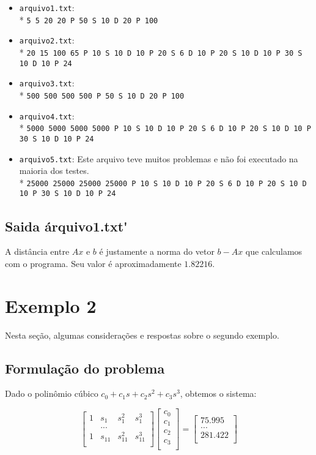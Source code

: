 \documentclass[12pt,a4paper]{article}
\begin{document}
\begin{itemize}
\item \verb+arquivo1.txt+: \\*
\texttt{5 5 20 20 P 50 S 10 D 20 P 100}
\item \verb+arquivo2.txt+: \\*
\texttt{20 15 100 65 P 10 S 10 D 10 P 20 S 6 D 10 P 20 S 10 D 10 P 30 S 10 D 10 P 24}
\item \verb+arquivo3.txt+: \\*
\texttt{500 500 500 500 P 50 S 10 D 20 P 100}
\item \verb+arquivo4.txt+: \\*
\texttt{5000 5000 5000 5000 P 10 S 10 D 10 P 20 S 6 D 10 P 20 S 10 D 10 P 30 S 10 D 10 P 24}
\item \verb+arquivo5.txt+: Este arquivo teve muitos problemas e não foi executado na maioria dos testes. \\*
\texttt{25000 25000 25000 25000 P 10 S 10 D 10 P 20 S 6 D 10 P 20 S 10 D 10 P 30 S 10 D 10 P 24}
\end{itemize}

\subsection{Saida \'arquivo1.txt\'}


A distância entre $Ax$ e $b$ é justamente a norma do vetor $b-Ax$ que calculamos com o programa.
Seu valor é aproximadamente $1.82216$.

\pagebreak
\section{Exemplo 2}
Nesta seção, algumas considerações e respostas sobre o segundo exemplo.
\subsection{Formulação do problema}
Dado o polinômio cúbico $c_0 + c_1s + c_2s^2 + c_3s^3$, obtemos o sistema:

\[
\left[
\begin{array}{cccc}
    1 & s_1 & s_{1}^{2} & s_{1}^{3} \\
      & ... \\
    1 & s_{11} & s_{11}^{2} & s_{11}^{3} \\
\end{array}
\right]
\left[
\begin{array}{c}
    c_0 \\
    c_1 \\
    c_2 \\
    c_3 \\
\end{array}
\right]
=
\left[
\begin{array}{c}
    75.995 \\
    ... \\
    281.422 \\
\end{array}
\right]
\]
\end{document}

